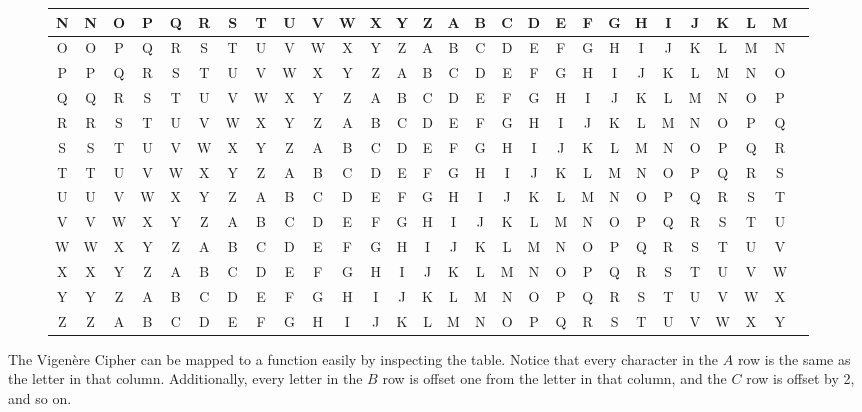 \documentclass[12pt]{article}
\begin{document}
\begin{figure}[ht]
\begin{adjustbox}{max width=\textwidth}
\begin{tabular}{| c || c | c | c | c | c | c | c | c | c | c | c | c | c | c | c | c | c | c | c | c | c | c | c | c | c | c | c ||}
N & N & O & P & Q & R & S & T & U & V & W & X & Y & Z & A & B & C & D & E & F & G & H & I & J & K & L & M \\ \hline
O & O & P & Q & R & S & T & U & V & W & X & Y & Z & A & B & C & D & E & F & G & H & I & J & K & L & M & N \\ \hline
P & P & Q & R & S & T & U & V & W & X & Y & Z & A & B & C & D & E & F & G & H & I & J & K & L & M & N & O \\ \hline
Q & Q & R & S & T & U & V & W & X & Y & Z & A & B & C & D & E & F & G & H & I & J & K & L & M & N & O & P \\ \hline
R & R & S & T & U & V & W & X & Y & Z & A & B & C & D & E & F & G & H & I & J & K & L & M & N & O & P & Q \\ \hline
S & S & T & U & V & W & X & Y & Z & A & B & C & D & E & F & G & H & I & J & K & L & M & N & O & P & Q & R \\ \hline
T & T & U & V & W & X & Y & Z & A & B & C & D & E & F & G & H & I & J & K & L & M & N & O & P & Q & R & S \\ \hline
U & U & V & W & X & Y & Z & A & B & C & D & E & F & G & H & I & J & K & L & M & N & O & P & Q & R & S & T \\ \hline
V & V & W & X & Y & Z & A & B & C & D & E & F & G & H & I & J & K & L & M & N & O & P & Q & R & S & T & U \\ \hline
W & W & X & Y & Z & A & B & C & D & E & F & G & H & I & J & K & L & M & N & O & P & Q & R & S & T & U & V \\ \hline
X & X & Y & Z & A & B & C & D & E & F & G & H & I & J & K & L & M & N & O & P & Q & R & S & T & U & V & W \\ \hline
Y & Y & Z & A & B & C & D & E & F & G & H & I & J & K & L & M & N & O & P & Q & R & S & T & U & V & W & X \\ \hline
Z & Z & A & B & C & D & E & F & G & H & I & J & K & L & M & N & O & P & Q & R & S & T & U & V & W & X & Y \\ \hline
	\end{tabular}
\end{adjustbox}


\end{figure}

The Vigen\`{e}re Cipher can be mapped to a function easily by inspecting the table. Notice that every character in the $A$ row is the same as the letter in that column. Additionally, every letter in the $B$ row is offset one from the letter in that column, and the $C$ row is offset by 2, and so on.
\end{document}
